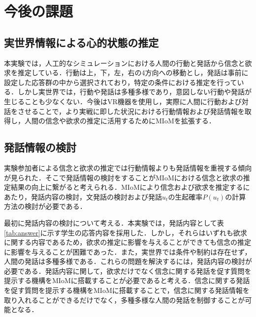 \chapter{今後の課題}

\section{実世界情報による心的状態の推定}
本実験では，人工的なシミュレーションにおける人間の行動と発話から信念と欲求を推定している．行動は上，下，左，右の4方向への移動とし，発話は事前に設定した応答群の中から選択されており，特定の条件における推定を行っている．しかし実世界では，行動や発話は多種多様であり，意図しない行動や発話が生じることも少なくない．今後はVR機器を使用し，実際に人間に行動および対話をさせることで，より実戦に即した状況における行動情報および発話情報を取得し，人間の信念や欲求の推定に活用するためにMIoMを拡張する．

\section{発話情報の検討}

\par
実験参加者による信念と欲求の推定では行動情報よりも発話情報を重視する傾向が見られた．そこで発話情報の検討をすることがMIoMにおける信念と欲求の推定結果の向上に繋がると考えられる．MIoMにより信念および欲求を推定するにあたり，発話内容の検討，文発話の検討および発話$u_t$の生起確率$P(u_t)$の計算方法の検討が必要である．

\par
最初に発話内容の検討について考える．本実験では，発話内容として表\ref{tab:answer}に示す学生の応答内容を採用した．しかし，それらはいずれも欲求に関する内容であるため，欲求の推定に影響を与えることができても信念の推定に影響を与えることが困難であった．また，実世界では条件や制約は存在せず，人間の発話は多種多様である．これらの問題を解決するには，発話内容の検討が必要である．発話内容に関して，欲求だけでなく信念に関する発話を促す質問を提示する機構をMIoMに搭載することが必要であると考える．信念に関する発話を促す質問を提示する機構をMIoMに搭載することで，信念に関する発話情報を取り入れることができるだけでなく，多種多様な人間の発話を制御することが可能となる．

